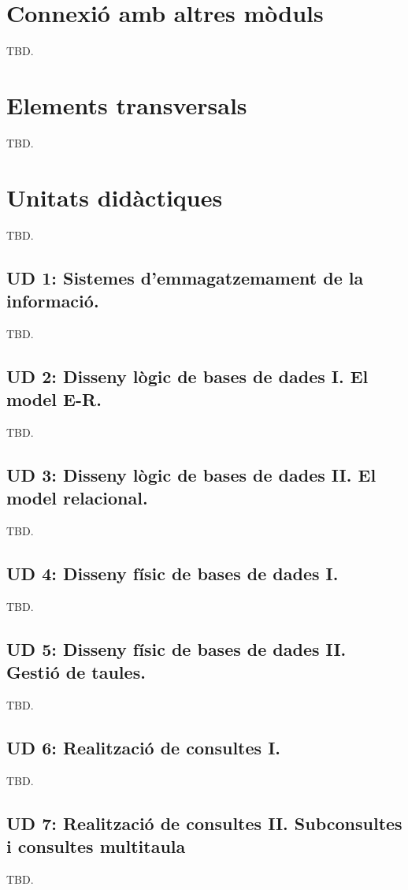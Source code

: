 \documentclass[catalan, a4paper, 12pt, titlepage]{article}
\begin{document}
\section{Connexió amb altres mòduls}
TBD.

\section{Elements transversals}
TBD.

\section{Unitats didàctiques}
TBD.

  \subsection{UD 1: Sistemes d'emmagatzemament de la informació.}
  TBD.

  \subsection{UD 2: Disseny lògic de bases de dades I. El model E-R.}
  TBD.

  \subsection{UD 3: Disseny lògic de bases de dades II. El model relacional.}
  TBD.

  \subsection{UD 4: Disseny físic de bases de dades I.}
  TBD.

  \subsection{UD 5: Disseny físic de bases de dades II. Gestió de taules.}
  TBD.

  \subsection{UD 6: Realització de consultes I.}
  TBD.

  \subsection{UD 7: Realització de consultes II. Subconsultes i consultes multitaula}
  TBD.
\end{document}

